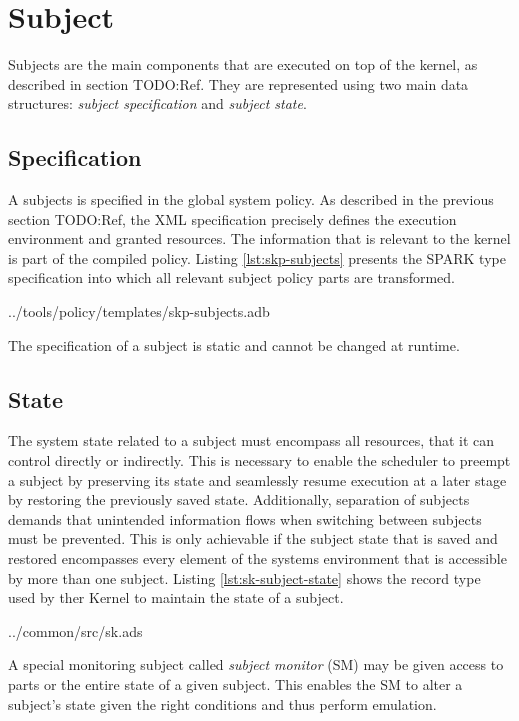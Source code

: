 \section{Subject}
Subjects are the main components that are executed on top of the kernel, as
described in section TODO:Ref. They are represented using two main data
structures: \emph{subject specification} and \emph{subject state}.

\subsection{Specification}
A subjects is specified in the global system policy. As described in the
previous section TODO:Ref, the XML specification precisely defines the execution
environment and granted resources. The information that is relevant to the
kernel is part of the compiled policy. Listing \ref{lst:skp-subjects} presents
the SPARK type specification into which all relevant subject policy parts are
transformed.


	{../tools/policy/templates/skp-subjects.adb}

The specification of a subject is static and cannot be changed at runtime.

\subsection{State}
The system state related to a subject must encompass all resources, that it can
control directly or indirectly. This is necessary to enable the scheduler to
preempt a subject by preserving its state and seamlessly resume execution at a
later stage by restoring the previously saved state.
Additionally, separation of subjects demands that unintended information flows
when switching between subjects must be prevented. This is only achievable if
the subject state that is saved and restored encompasses every element of the
systems environment that is accessible by more than one subject. Listing
\ref{lst:sk-subject-state} shows the record type used by ther Kernel to maintain
the state of a subject.


	{../common/src/sk.ads}

A special monitoring subject called \emph{subject monitor}
 (SM) may be given access to parts or the entire state of
a given subject. This enables the SM to alter a subject's state given the right
conditions and thus perform emulation.
